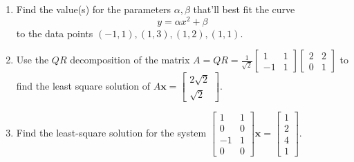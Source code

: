 \documentclass[10pt, titlepage]{article}
\renewcommand{\vec}[1]{\mathbf{#1}}
\DeclareMathOperator{\vspan}{Span}
\DeclareMathOperator{\proj}{proj}
\begin{document}
\begin{enumerate}
\begin{enumerate}
				\item Find the coordinate vector of \(\begin{bmatrix}3 \\ 1 \\ 1\end{bmatrix}\) under the basis formed by 
				\(\mathcal{B} = \{\vec{u}_1, \vec{u}_2\}\).
				\item Find a vector \(\vec{x} \in \mathbb{R}^3\) such that:
					\begin{enumerate}
						\item \(\vec{x}\) is orthogonal to \(\vec{u}_3\).
						\item \(\proj_{\mathcal{L}_1} \vec{x} = 5\vec{u}_1,\) where \(\mathcal{L}_1 = \vspan \{\vec{u}_1\}\)
						\item \(\proj_{\mathcal{L}_2} \vec{x} = 3\vec{u}_2,\) where \(\mathcal{L}_2 = \vspan\{\vec{u}_2\}\)
					\end{enumerate} 
			\end{enumerate}
		\item Find the value(s) for the parameters \(\alpha, \beta\) that'll best fit the curve \[y = \alpha x^2 + \beta\] to the data points 
			\((-1, 1), (1, 3), (1, 2), (1, 1)\).
		\item Use the \(QR\) decomposition of the matrix \(A = QR = \frac{1}{\sqrt{2}}\begin{bmatrix}1 & 1 \\ -1 & 1\end{bmatrix}\begin{bmatrix}2 & 2 \\0 & 1\end{bmatrix}\) to find the least square solution of \(A\vec{x} = \begin{bmatrix}2\sqrt{2} \\ \sqrt{2}\end{bmatrix}\).

		\item Find the least-square solution for the system
			\(\begin{bmatrix}1 & 1 \\ 0 & 0 \\ -1 & 1\\ 0 & 0\end{bmatrix}\vec{x} =  \begin{bmatrix}1 \\ 2 \\ 4 \\ 1\end{bmatrix}\).
	\end{enumerate}

\newpage

\end{document}
